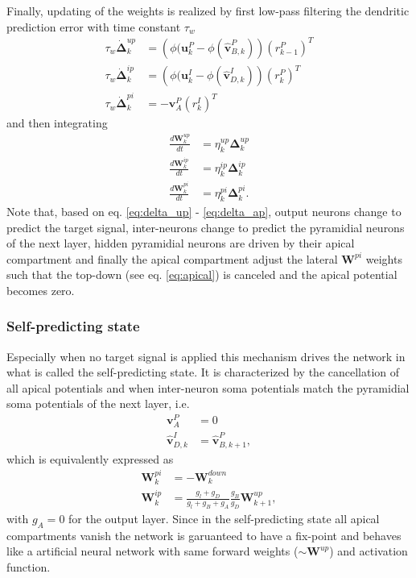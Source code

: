 \documentclass[12pt,a4paper]{article}
\begin{document}
Finally, updating of the weights is realized by first low-pass filtering the dendritic prediction error with time constant $\tau_w$
\begin{align}
\tau_w\dot{\bm{\Delta}}^{up}_k &= \left(\phi(\bm{u}^P_k - \phi(\hat{\bm{v}}^P_{B,k})\right)(r^P_{k-1})^T\\\label{eq:delta_up}
\tau_w\dot{\bm{\Delta}}^{ip}_k &= \left(\phi(\bm{u}^I_k - \phi(\hat{\bm{v}}^I_{D,k})\right)(r^P_{k})^T\\
\tau_w\dot{\bm{\Delta}}^{pi}_k &= -\bm{v}^P_A(r^I_{k})^T \label{eq:delta_ap}
\end{align}
and then integrating
\begin{align}
\frac{d\bm{W}^{up}_k}{dt} &= \eta^{up}_k\bm{\Delta}^{up}_k \\
\frac{d\bm{W}^{ip}_k}{dt} &= \eta^{ip}_k\bm{\Delta}^{ip}_k \\
\frac{d\bm{W}^{pi}_k}{dt} &= \eta^{pi}_k\bm{\Delta}^{pi}_k.
\end{align}
Note that, based on eq. \eqref{eq:delta_up} - \eqref{eq:delta_ap}, output neurons change to predict the target signal, inter-neurons change to predict the pyramidial neurons of the next layer, hidden pyramidial neurons are driven by their apical compartment and finally the apical compartment adjust the lateral $\bm{W}^{pi}$ weights such that the top-down (see eq. \eqref{eq:apical}) is canceled and the apical potential becomes zero.\\

\subsubsection{Self-predicting state}
Especially when no target signal is applied this mechanism drives the network in what is called the self-predicting state. It is characterized by the cancellation of all apical potentials and when inter-neuron soma potentials match the pyramidial soma potentials of the next layer, i.e.
\begin{align}
\bm{v}^P_A &= 0\\
\hat{\bm{v}}^I_{D,k} &= \hat{\bm{v}}^P_{B,k+1},
\end{align} 
which is equivalently expressed as 
\begin{align}
\bm{W}^{pi}_k &= - \bm{W}^{down}_k\\
\bm{W}^{ip}_k &= \frac{g_l + g_D}{g_l + g_B + g_A}\frac{g_B}{g_D}\bm{W}^{up}_{k+1},
\end{align}
with $g_A = 0$ for the output layer. Since in the self-predicting state all apical compartments vanish the network is garuanteed to have a fix-point and behaves like a artificial neural network with same forward weights ($\sim \bm{W}^{up}$) and activation function. 
\end{document}
